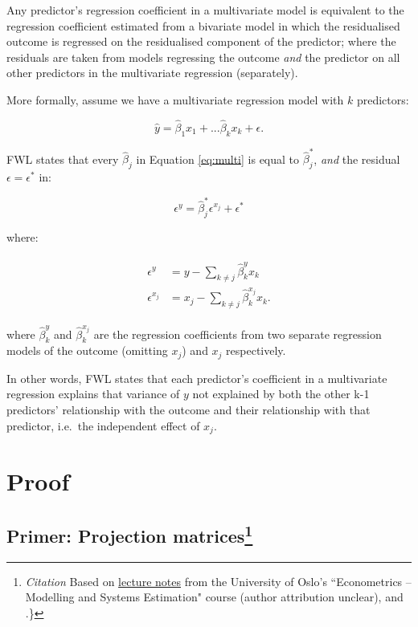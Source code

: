 \documentclass[
]{book}
\begin{document}
Any predictor's regression coefficient in a multivariate model is equivalent to the regression coefficient estimated from a bivariate model in which the residualised outcome is regressed on the residualised component of the predictor; where the residuals are taken from models regressing the outcome \emph{and} the predictor on all other predictors in the multivariate regression (separately).

More formally, assume we have a multivariate regression model with \(k\) predictors:

\begin{equation}
\hat{y} = \hat{\beta}_{1}x_{1} + ... \hat{\beta}_{k}x_{k} + \epsilon. \label{eq:multi}
\end{equation}

FWL states that every \(\hat{\beta}_{j}\) in Equation \ref{eq:multi} is equal to \(\hat{\beta}^{*}_{j}\), \textit{and} the residual \(\epsilon = \epsilon^{*}\) in:

\begin{equation}
     \epsilon^{y} = \hat{\beta}^{*}_{j}\epsilon^{x_j} + \epsilon^{*} 
\end{equation}

where:

\begin{align}
\begin{aligned}
     \epsilon^y & = y - \sum_{k \neq j}\hat{\beta}^{y}_{k}x_{k} \\
     \epsilon^{x_{j}} &= x_j - \sum_{k \neq j}\hat{\beta}^{x_{j}}_{k}x_{k}.
\end{aligned}
\end{align}

where \(\hat{\beta}^{y}_k\) and \(\hat{\beta}^{x_j}_k\) are the regression coefficients from two separate regression models of the outcome (omitting \(x_j\)) and \(x_j\) respectively.

In other words, FWL states that each predictor's coefficient in a multivariate regression explains that variance of \(y\) not explained by both the other k-1 predictors' relationship with the outcome and their relationship with that predictor, i.e.~the independent effect of \(x_j\).

\hypertarget{proof_fw}{%
\section{Proof}\label{proof_fw}}

\hypertarget{primer-projection-matricessecnote}{%
\subsection[Primer: Projection matrices]{\texorpdfstring{Primer: Projection matrices\footnote{\emph{Citation} Based on \href{https://www.uio.no/studier/emner/sv/oekonomi/ECON4160/h13/undervisningsmateriale/lnote1h13-.pdf}{lecture notes} from the University of Oslo's ``Econometrics -- Modelling and Systems Estimation" course (author attribution unclear), and \citet{davidson2004econometric}.\}}}{Primer: Projection matrices}}\label{primer-projection-matricessecnote}}
\end{document}
